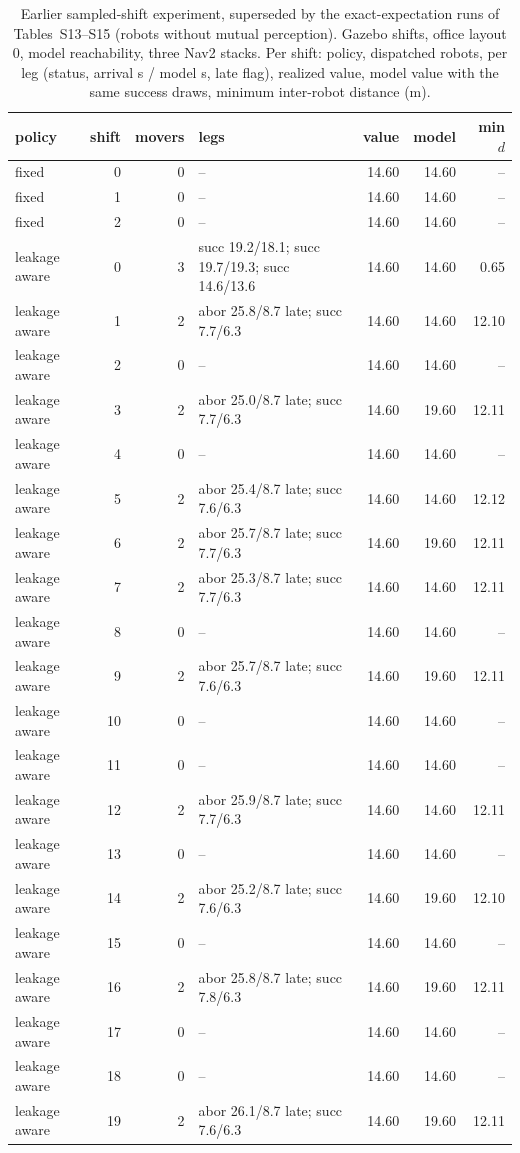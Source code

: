 \begin{table}[h]\centering\caption{Earlier sampled-shift experiment, superseded by the exact-expectation runs of Tables~S13--S15 (robots without mutual perception). Gazebo shifts, office layout 0, model reachability, three Nav2 stacks. Per shift: policy, dispatched robots, per leg (status, arrival s / model s, late flag), realized value, model value with the same success draws, minimum inter-robot distance (m).}\scriptsize
\begin{tabular}{@{}lrrp{3.9cm}rrr@{}}\toprule policy & shift & movers & legs & value & model & min $d$\\\midrule
fixed & 0 & 0 & -- & 14.60 & 14.60 & --\\
fixed & 1 & 0 & -- & 14.60 & 14.60 & --\\
fixed & 2 & 0 & -- & 14.60 & 14.60 & --\\
leakage aware & 0 & 3 & succ 19.2/18.1; succ 19.7/19.3; succ 14.6/13.6 & 14.60 & 14.60 & 0.65\\
leakage aware & 1 & 2 & abor 25.8/8.7 late; succ 7.7/6.3 & 14.60 & 14.60 & 12.10\\
leakage aware & 2 & 0 & -- & 14.60 & 14.60 & --\\
leakage aware & 3 & 2 & abor 25.0/8.7 late; succ 7.7/6.3 & 14.60 & 19.60 & 12.11\\
leakage aware & 4 & 0 & -- & 14.60 & 14.60 & --\\
leakage aware & 5 & 2 & abor 25.4/8.7 late; succ 7.6/6.3 & 14.60 & 14.60 & 12.12\\
leakage aware & 6 & 2 & abor 25.7/8.7 late; succ 7.7/6.3 & 14.60 & 19.60 & 12.11\\
leakage aware & 7 & 2 & abor 25.3/8.7 late; succ 7.7/6.3 & 14.60 & 14.60 & 12.11\\
leakage aware & 8 & 0 & -- & 14.60 & 14.60 & --\\
leakage aware & 9 & 2 & abor 25.7/8.7 late; succ 7.6/6.3 & 14.60 & 19.60 & 12.11\\
leakage aware & 10 & 0 & -- & 14.60 & 14.60 & --\\
leakage aware & 11 & 0 & -- & 14.60 & 14.60 & --\\
leakage aware & 12 & 2 & abor 25.9/8.7 late; succ 7.7/6.3 & 14.60 & 14.60 & 12.11\\
leakage aware & 13 & 0 & -- & 14.60 & 14.60 & --\\
leakage aware & 14 & 2 & abor 25.2/8.7 late; succ 7.6/6.3 & 14.60 & 19.60 & 12.10\\
leakage aware & 15 & 0 & -- & 14.60 & 14.60 & --\\
leakage aware & 16 & 2 & abor 25.8/8.7 late; succ 7.8/6.3 & 14.60 & 19.60 & 12.11\\
leakage aware & 17 & 0 & -- & 14.60 & 14.60 & --\\
leakage aware & 18 & 0 & -- & 14.60 & 14.60 & --\\
leakage aware & 19 & 2 & abor 26.1/8.7 late; succ 7.6/6.3 & 14.60 & 19.60 & 12.11\\
\bottomrule\end{tabular}\end{table}
